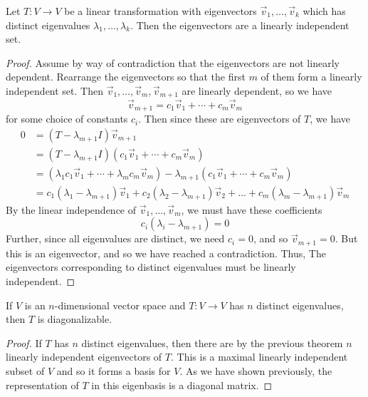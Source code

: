 \begin{theorem}
Let $T:V\rightarrow V$ be a linear transformation with eigenvectors $\vec{v}_1,\ldots,\vec{v}_k$ which has distinct eigenvalues $\lambda_1, \ldots, \lambda_k$. Then the eigenvectors are a linearly independent set.
\end{theorem}
\begin{proof}
Assume by way of contradiction that the eigenvectors are not linearly dependent. Rearrange the eigenvectors so that the first $m$ of them form a linearly independent set. Then $\vec{v}_1,\ldots, \vec{v}_m,\vec{v}_{m+1}$ are linearly dependent, so we have \[ \vec{v}_{m+1} = c_1 \vec{v}_1 + \cdots + c_m \vec{v}_m \] for some choice of constants $c_i$. Then since these are eigenvectors of $T$, we have
\begin{align*}
	0 & = \left(T - \lambda_{m+1} I \right)\vec{v}_{m+1} \\
	& = \left(T - \lambda_{m+1} I \right) \left(c_1 \vec{v}_1 + \cdots + c_m \vec{v}_m\right) \\
	& = \left(\lambda_1 c_1 \vec{v}_1 + \cdots + \lambda_m c_m \vec{v}_m\right) - \lambda_{m+1}\left(c_1 \vec{v}_1 + \cdots + c_m \vec{v}_m\right) \\
	& = c_1\left(\lambda_1-\lambda_{m+1}\right) \vec{v}_1  + c_2\left(\lambda_2-\lambda_{m+1}\right) \vec{v}_2  + \ldots + c_m\left(\lambda_m-\lambda_{m+1}\right) \vec{v}_m 
\end{align*}
By the linear independence of $\vec{v}_1,\ldots,\vec{v}_m$, we must have these coefficients \[ c_i \left(\lambda_i - \lambda_{m+1}\right) = 0\] Further, since all eigenvalues are distinct, we need $c_i = 0$, and so $\vec{v}_{m+1} = 0$. But this is an eigenvector, and so we have reached a contradiction. Thus, The eigenvectors corresponding to distinct eigenvalues must be linearly independent.
\end{proof}


\begin{corollary}
If $V$ is an $n$-dimensional vector space and $T:V\rightarrow V$ has $n$ distinct eigenvalues, then $T$ is diagonalizable.
\end{corollary}
\begin{proof}
If $T$ has $n$ distinct eigenvalues, then there are by the previous theorem $n$ linearly independent eigenvectors of $T$. This is a maximal linearly independent subset of $V$ and so it forms a basis for $V$. As we have shown previously, the representation of $T$ in this eigenbasis is a diagonal matrix.
\end{proof}

